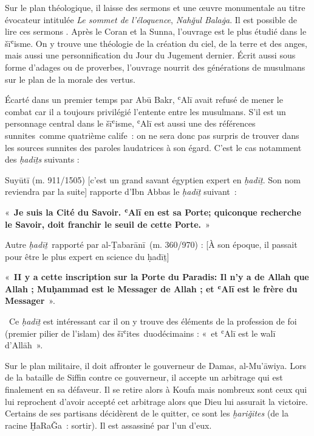 Sur le plan théologique, il laisse des sermons et une œuvre monumentale
au titre évocateur intitulée \emph{Le sommet de l'éloquence},
\emph{Nahǧul Balaġa}. Il est possible de lire ces sermons
. Après le Coran et la Sunna, l'ouvrage est le plus étudié dans
le šīʿisme. On y trouve une théologie de la création du ciel, de la
terre et des anges, mais aussi une personnification du Jour du Jugement
dernier. Écrit aussi sous forme d'adages ou de proverbes, l'ouvrage
nourrit des générations de musulmans sur le plan de la morale des
vertus.

Écarté dans un premier temps par Abū Bakr, ʿAlī avait refusé de mener le
combat car il a toujours privilégié l'entente entre les musulmans. S'il
est un personnage central dans le šīʿisme, ʿAlī est aussi une des
références sunnites~comme quatrième calife~: on ne sera donc pas surpris
de trouver dans les sources sunnites des paroles laudatrices à son
égard. C'est le cas notamment des \emph{ḥadīṯs} suivants :

Suyūtī (m. 911/1505) {[}c'est un grand savant égyptien expert en
\emph{ḥadīṯ}. Son nom reviendra par la suite{]} rapporte d'Ibn Abbas le
\emph{ḥadīṯ} suivant~:

«~\textbf{Je suis la Cité du Savoir. ʿAlī en est sa Porte; quiconque
recherche le Savoir, doit franchir le seuil de cette Porte.}~»

Autre \emph{ḥadīṯ}~rapporté par al-Ṭabarānī~(m. 360/970) : {[}À son
époque, il passait pour être le plus expert en science du ḥadīṯ{]}

«~\textbf{II y a cette inscription sur la Porte du Paradis: Il n'y a de
Allah que Allah ; Muḥammad est le Messager de Allah ; et ʿAlī est le
frère du Messager}~».~

~Ce \emph{ḥadīṯ} est intéressant car il on y trouve des éléments de la
profession de foi (premier pilier de l'islam) des šīʿites~duodécimains :
«~et ʿAlī est le walī d'Allāh~».

Sur le plan militaire, il doit affronter le gouverneur de Damas,
al-Mu'āwiya. Lors de la bataille de Siffin contre ce gouverneur, il
accepte un arbitrage qui est finalement en sa défaveur. Il se retire
alors à Koufa mais nombreux sont ceux qui lui reprochent d'avoir accepté
cet arbitrage alors que Dieu lui assurait la victoire. Certains de ses
partisans décidèrent de le quitter, ce sont les \emph{ḫariǧites} (de la
racine ḪaRaǦa~: sortir). Il est assassiné par l'un d'eux.


